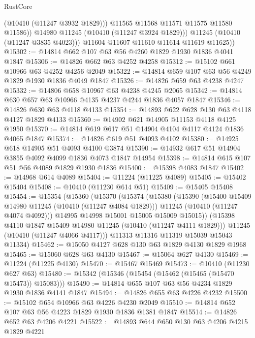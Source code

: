 \begin{lexlean}{RustCore}
\begin{coremodule}
                  (@10410 (@11247 @3932 @1829)))
                @11565
                @11568
                @11571
                @11575
                @11580
                @11586))
            @14980
            @11245
            (@10410 (@11247 @3924 @1829)))
          @11245
          (@10410 (@11247 @3835 @4023)))
        @11604
        @11607
        @11610
        @11614
        @11619
        @11625))
@15302 := @14814 @662 @107 @63 @56 @4260 @1829 @1930 @1836 @4041 @1847
@15306 := @14826 @662 @63 @4252 @4258
@15312 := @15102 @661 @10966 @63 @4252 @4256 @2049
@15322 := @14814 @659 @107 @63 @56 @4249 @1829 @1930 @1836 @4049 @1847
@15326 := @14826 @659 @63 @4238 @4247
@15332 := @14806 @658 @10967 @63 @4238 @4245 @2065
@15342 := @14814 @630 @657 @63 @10966 @4135 @4237 @4244 @1836 @4057 @1847
@15346 := @14826 @630 @63 @4118 @4133
@15354 := @14893 @622 @628 @130 @63 @4118 @4127 @1829 @4133
@15360 := @14902 @621 @14905 @11153 @4118 @4125 @1950
@15370 := @14814 @619 @617 @51 @14904 @4104 @4117 @4124 @1836 @4065 @1847
@15374 := @14826 @619 @51 @4093 @4102
@15380 := @14925 @618 @14905 @51 @4093 @4100 @3874
@15390 := @14932 @617 @51 @14904 @3855 @4092 @4099 @1836 @4073 @1847 @14954
@15398 := @14814 @615 @107 @51 @56 @4089 @1829 @1930 @1836
@15400 := @15398 @4083 @1847
@15402 := @14968 @614 @4089
@15404 := @11224 (@11225 @4089)
@15405 := @15402 @15404
@15408 := @10410 (@11230 @614 @51)
@15409 := @15405 @15408
@15454 := @15354
    (@15360
      (@15370
        (@15374
          (@15380
            (@15390
              (@15400 @15409 @14980 @11245 (@10410 (@11247 @4084 @1829)))
              @11245
              (@10410 (@11247 @4074 @4092)))
            @14995
            @14998
            @15001
            @15005
            @15009
            @15015))
        (@15398 @4110 @1847 @15409 @14980 @11245 (@10410 (@11247 @4111 @1829)))
        @11245
        (@10410 (@11247 @4066 @4117)))
      @11313
      @11316
      @11319
      @15039
      @15043
      @11334)
@15462 := @15050 @4127 @628 @130 @63 @1829 @4130 @1829 @1968
@15465 := @15060 @628 @63 @4130
@15467 := @15064 @627 @4130
@15469 := @11224 (@11225 @4130)
@15470 := @15467 @15469
@15473 := @10410 (@11230 @627 @63)
@15480 := @15342 (@15346 (@15454 (@15462 (@15465 (@15470 @15473)) @15083)))
@15490 := @14814 @655 @107 @63 @56 @4234 @1829 @1930 @1836 @4141 @1847
@15494 := @14826 @655 @63 @4226 @4232
@15500 := @15102 @654 @10966 @63 @4226 @4230 @2049
@15510 := @14814 @652 @107 @63 @56 @4223 @1829 @1930 @1836 @1381 @1847
@15514 := @14826 @652 @63 @4206 @4221
@15522 := @14893 @644 @650 @130 @63 @4206 @4215 @1829 @4221

\end{coremodule}
\end{lexlean}
